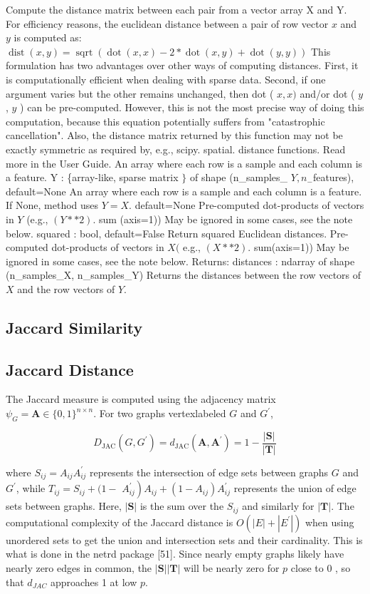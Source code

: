 Compute the distance matrix between each pair from a vector array $\mathrm{X}$ and $\mathrm{Y}$.
For efficiency reasons, the euclidean distance between a pair of row vector $x$ and $y$ is computed as:
$\operatorname{dist}(x, y)=\operatorname{sqrt}(\operatorname{dot}(x, x)-2 * \operatorname{dot}(x, y)+\operatorname{dot}(y, y))$
This formulation has two advantages over other ways of computing distances. First, it is computationally efficient when dealing with sparse data. Second, if one argument varies but the other remains unchanged, then dot ( $x, x)$ and/or dot ( $y$, $y$ ) can be pre-computed.
However, this is not the most precise way of doing this computation, because this equation potentially suffers from "catastrophic cancellation". Also, the distance matrix returned by this function may not be exactly symmetric as required by, e.g., scipy. spatial. distance functions.
Read more in the User Guide. An array where each row is a sample and each column is a feature.
Y : \{array-like, sparse matrix $\}$ of shape (n_samples_ $Y, n_{-}$features), default=None An array where each row is a sample and each column is a feature. If None, method uses $Y=X$. default=None
Pre-computed dot-products of vectors in $Y$ (e.g., $(Y * * 2) .$ sum (axis=1)) May be ignored in some cases, see the note below.
squared : bool, default=False
Return squared Euclidean distances.
Pre-computed dot-products of vectors in $X($ e.g., $(X * * 2)$. sum(axis=1)) May be ignored in some cases, see the note below.
Returns: distances : ndarray of shape (n_samples_X, n_samples_Y) Returns the distances between the row vectors of $X$ and the row vectors of $Y$.

\subsection{Jaccard Similarity}

\subsection{Jaccard Distance}
The Jaccard measure is computed using the adjacency matrix $\psi_{G}=\mathbf{A} \in\{0,1\}^{n \times n}$. For two graphs vertexlabeled $G$ and $G^{\prime}$,

$$
D_{\mathrm{JAC}}\left(G, G^{\prime}\right)=d_{\mathrm{JAC}}\left(\mathbf{A}, \mathbf{A}^{\prime}\right)=1-\frac{|\mathbf{S}|}{|\mathbf{T}|}
$$

where $S_{i j}=A_{i j} A_{i j}^{\prime}$ represents the intersection of edge sets between graphs $G$ and $G^{\prime}$, while $T_{i j}=S_{i j}+(1-$ $\left.A_{i j}^{\prime}\right) A_{i j}+\left(1-A_{i j}\right) A_{i j}^{\prime}$ represents the union of edge sets between graphs. Here, $|\mathbf{S}|$ is the sum over the $S_{i j}$ and similarly for $|\mathbf{T}|$. The computational complexity of the Jaccard distance is $O\left(|E|+\left|E^{\prime}\right|\right)$ when using unordered sets to get the union and intersection sets and their cardinality. This is what is done in the netrd package [51]. Since nearly empty graphs likely have nearly zero edges in common, the $|\mathbf{S}||\mathbf{T}|$ will be nearly zero for $p$ close to 0 , so that $d_{J A C}$ approaches 1 at low $p$.

